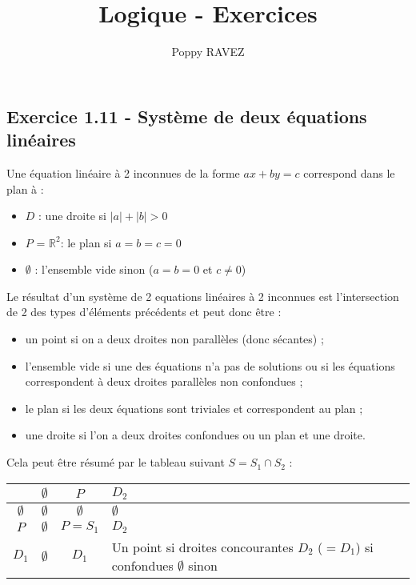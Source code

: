 \documentclass[a4paper,10pt]{report}
\title{Logique - Exercices}
\author{Poppy RAVEZ}
\begin{document}
	
	
\subsection*{Exercice 1.11 - Système de deux équations linéaires}

Une équation linéaire à 2 inconnues de la forme $ax +by = c$ correspond dans le plan à :
\begin{itemize}
	\item $D$ : une droite si $|a| + |b| > 0$
	\item $P$ = $\mathbb{R}^2$: le plan si $a=b=c=0$
	\item $\emptyset$ : l'ensemble vide sinon ($a=b=0$ et $c\neq0$)
\end{itemize}

Le résultat d'un système de 2 equations linéaires à 2 inconnues est l'intersection
de 2 des types d'éléments précédents et peut donc être :
\begin{itemize}
	\item un point si on a deux droites non parallèles (donc sécantes) ;
	\item l'ensemble vide si une des équations n'a pas de solutions ou si les équations
	      correspondent à deux droites parallèles non confondues ;
	\item le plan si les deux équations sont triviales et correspondent au plan ;
	\item une droite si l'on a deux droites confondues ou un plan et une droite.
\end{itemize}

Cela peut être résumé par le tableau suivant $S = S_1 \cap S_2$ :

\begin{tabular}{|c|c|c|p{5cm}|}
	\hline
	 \diagbox{$S_1$}{$S_2$}& $\emptyset$ & $P$         & $D_2$                            \tabularnewline
	\hline
	$\emptyset$            & $\emptyset$ & $\emptyset$ & $\emptyset$                      \tabularnewline
	\hline
	$P$                    & $\emptyset$ & $P = S_1$         & $D_2$                            \tabularnewline
	\hline
	$D_1$                  & $\emptyset$ & $D_1$       & Un point si droites concourantes \newline
	                                                     $D_2$ ($=D_1$) si confondues     \newline
	                                                     $\emptyset$ sinon                \tabularnewline
	\hline
\end{tabular}
\end{document}
